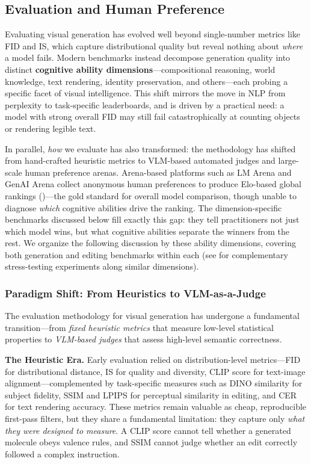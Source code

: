 \documentclass{llmxive}
\begin{document}
\subsection{Evaluation and Human Preference}
\label{sec:benchmarks}

Evaluating visual generation has evolved well beyond single-number metrics like FID and IS, which capture distributional quality but reveal nothing about \emph{where} a model fails. Modern benchmarks instead decompose generation quality into distinct \textbf{cognitive ability dimensions}---compositional reasoning, world knowledge, text rendering, identity preservation, and others---each probing a specific facet of visual intelligence. This shift mirrors the move in NLP from perplexity to task-specific leaderboards, and is driven by a practical need: a model with strong overall FID may still fail catastrophically at counting objects or rendering legible text.

In parallel, \emph{how} we evaluate has also transformed: the methodology has shifted from hand-crafted heuristic metrics to VLM-based automated judges and large-scale human preference arenas. Arena-based platforms such as LM Arena and GenAI Arena collect anonymous human preferences to produce Elo-based global rankings ()---the gold standard for overall model comparison, though unable to diagnose \emph{which} cognitive abilities drive the ranking. The dimension-specific benchmarks discussed below fill exactly this gap: they tell practitioners not just which model wins, but what cognitive abilities separate the winners from the rest. We organize the following discussion by these ability dimensions, covering both generation and editing benchmarks within each (see  for complementary stress-testing experiments along similar dimensions).


\subsubsection{Paradigm Shift: From Heuristics to VLM-as-a-Judge}
\label{subsubsec:eval_paradigm}

The evaluation methodology for visual generation has undergone a fundamental transition---from \emph{fixed heuristic metrics} that measure low-level statistical properties to \emph{VLM-based judges} that assess high-level semantic correctness.

\textbf{The Heuristic Era.}
Early evaluation relied on distribution-level metrics---FID for distributional distance, IS for quality and diversity, CLIP score for text-image alignment---complemented by task-specific measures such as DINO similarity for subject fidelity, SSIM and LPIPS for perceptual similarity in editing, and CER for text rendering accuracy. These metrics remain valuable as cheap, reproducible first-pass filters, but they share a fundamental limitation: they capture only \emph{what they were designed to measure}. A CLIP score cannot tell whether a generated molecule obeys valence rules, and SSIM cannot judge whether an edit correctly followed a complex instruction.
\end{document}
